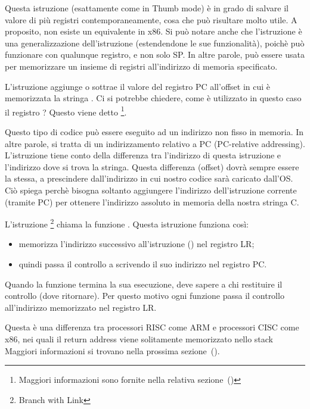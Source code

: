 Questa istruzione (esattamente come \PUSH in Thumb mode) è in grado di salvare il valore di più registri contemporaneamente, cosa che può risultare molto utile.
A proposito, non esiste un equivalente in x86.
Si può notare anche che l'istruzione  è una generalizzazione
dell'istruzione \PUSH (estendendone le sue funzionalità), poichè può funzionare con qualunque registro, e non solo \ac{SP}.
In altre parole,  può essere usata per memorizzare un insieme di registri all'indirizzo di memoria specificato.

\myindex{\PICcode}
L'istruzione 
aggiunge o sottrae il valore del registro \ac{PC} all'offset in cui è memorizzata la stringa .
Ci si potrebbe chiedere, come è utilizzato in questo caso il registro ?
Questo viene detto \q{\PICcode}\footnote{Maggiori informazioni sono fornite nella relativa sezione~()}.

Questo tipo di codice può essere eseguito ad un indirizzo non fisso in memoria.
In altre parole, si tratta di un indirizzamento relativo a \ac{PC} (\ac{PC}-relative addressing).
L'istruzione  tiene conto della differenza tra l'indirizzo di questa istruzione e l'indirizzo dove si trova la stringa.
Questa differenza (offset) dovrà sempre essere la stessa, a prescindere dall'indirizzo in cui nostro codice sarà caricato dall'\ac{OS}.
Ciò spiega perchè bisogna soltanto aggiungere l'indirizzo dell'istruzione corrente (tramite \ac{PC}) per ottenere l'indirizzo assoluto in memoria della nostra stringa C.

L'istruzione \footnote{Branch with Link} chiama la funzione \printf.
Questa istruzione funziona così:

\begin{itemize}
\item memorizza l'indirizzo successivo all'istruzione  () nel registro \ac{LR};
\item quindi passa il controllo a \printf scrivendo il suo indirizzo nel registro \ac{PC}.
\end{itemize}

Quando la funzione \printf termina la sua esecuzione, deve sapere a chi restituire il controllo (dove ritornare).
Per questo motivo ogni funzione passa il controllo all'indirizzo memorizzato nel registro \ac{LR}.

Questa è una differenza tra processori \ac{RISC}  come ARM e processori \ac{CISC} come x86,
nei quali il return address viene solitamente memorizzato nello stack
Maggiori informazioni si trovano nella prossima sezione~().

